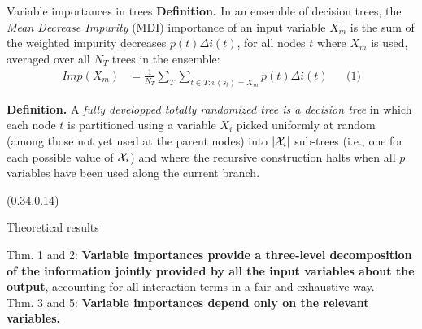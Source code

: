 \documentclass[final]{beamer}
\newcommand{\cmark}{\ding{51}}%
\begin{document}
\begin{frame}{}
\begin{textblock}{0.32}
\begin{block}{Variable importances in trees \phantom{p}}
\textbf{Definition.} In an ensemble of decision trees, the \textit{Mean
Decrease Impurity} (MDI) importance of an input variable $X_m$ is the
sum of the weighted impurity decreases $p(t)\Delta i(t)$, for all nodes $t$
where $X_m$ is used, averaged over all $N_T$ trees in the ensemble:
\begin{align*}\label{eq:mdi}
Imp(X_m) &= \frac{1}{N_T} \sum_{T} \sum_{t \in T:v(s_t) = X_m} p(t) \Delta i(t) &&\text{(1)}
\end{align*}

\vspace{0.3cm}

\textbf{Definition.} A \textit{fully developped  totally randomized tree is a decision tree} in which each node $t$ is
partitioned using a variable $X_i$ picked uniformly at random (among those not
yet used at the parent nodes) into $|{\cal
X}_i|$ sub-trees (i.e., one for each possible value of ${\cal X}_i$) and where
the recursive construction halts when all $p$ variables have been
used along the current branch.

\end{block}

\end{textblock}




\begin{textblock}{0.32}(0.34,0.14)

\begin{block}{Theoretical results \phantom{p}}

{\color{green} \cmark} Thm. 1 and 2: \textbf{Variable importances provide a three-level decomposition
of the information jointly provided by all the input variables about the output}, accounting for all interaction terms in a fair and exhaustive way.\\
{\color{green} \cmark} Thm. 3 and 5: \textbf{Variable importances depend only on the relevant
variables.}


\end{block}
\end{textblock}
\end{frame}
\end{document}
